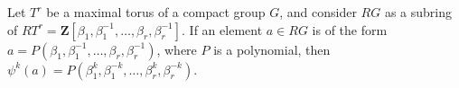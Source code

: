 Let $T^r$ be a maximal torus of a compact group $G$, and consider $RG$ as a subring of $RT^r = \mathbf{Z}[\beta_1, \beta_1^{-1}, \ldots, \beta_r, \beta_r^{-1}]$. If an element $a \in RG$ is of the form $a = P(\beta_1, \beta_1^{-1}, \ldots, \beta_r, \beta_r^{-1})$, where $P$ is a polynomial, then $\psi^k(a) = P(\beta_1^k, \beta_1^{-k}, \ldots, \beta_r^k, \beta_r^{-k})$.
